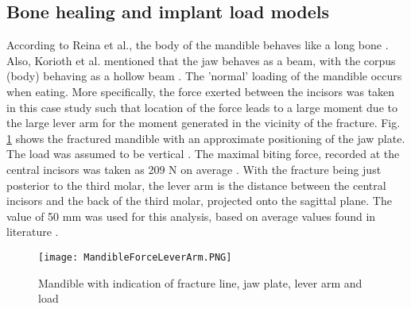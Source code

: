 \subsection{Bone healing and implant load models}

According to Reina et al., the body of the mandible behaves like a long bone \cite{Reina}. Also, Korioth et al. mentioned that the jaw behaves as a beam, with the corpus (body) behaving as a hollow beam \cite{Korioth}. The 'normal' loading of the mandible occurs when eating. More specifically, the force exerted between the incisors was taken in this case study such that location of the force leads to a large moment due to the large lever arm for the moment generated in the vicinity of the fracture. Fig. \ref{fig:MandibleForceLeverArm} shows the fractured mandible with an approximate positioning of the jaw plate. The load was assumed to be vertical \cite{Reina}. The maximal biting force, recorded at the central incisors was taken as 209 N on average \cite{Mansour}. With the fracture being just posterior to the third molar, the lever arm is the distance between the central incisors and the back of the third molar, projected onto the sagittal plane. The value of 50 mm was used for this analysis, based on average values found in literature \cite{dentwiki}.

\begin{figure}[h]
    \centering
    \texttt{[image: MandibleForceLeverArm.PNG]}
    \caption{Mandible with indication of fracture line, jaw plate, lever arm and load \cite{odora}}
    \label{fig:MandibleForceLeverArm}
\end{figure}

